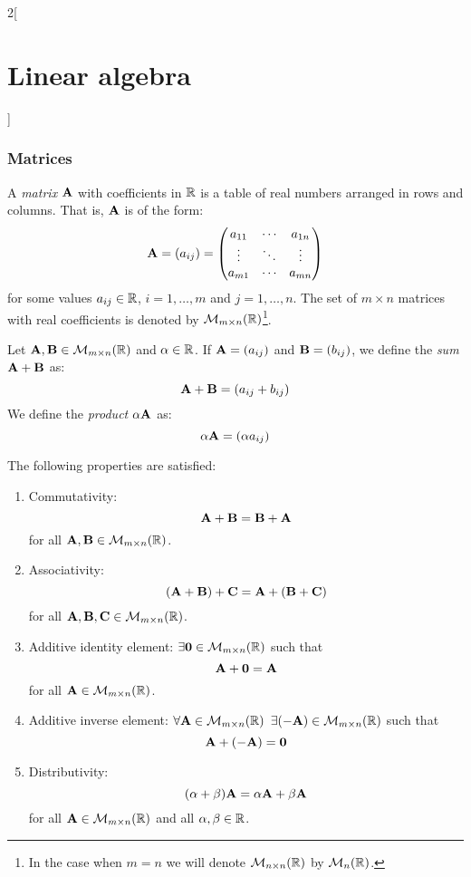 \documentclass[../../../main_math.tex]{subfiles}
\begin{document}
\begin{multicols}{2}[\section{Linear algebra}]
  \subsubsection{Matrices}
  \begin{definition}[Matrix]
    A \emph{matrix} $\boldsymbol{\mathrm{A}}$ with coefficients in $\mathbb{R}$ is a table of real numbers arranged in rows and columns. That is, $\boldsymbol{\mathrm{A}}$ is of the form:
    \begin{equation*}
      \boldsymbol{\mathrm{A}}=(a_{ij})=
      \begin{pmatrix}
        a_{11} & \cdots & a_{1n} \\
        \vdots & \ddots & \vdots \\
        a_{m1} & \cdots & a_{mn}
      \end{pmatrix}
    \end{equation*}
    for some values $a_{ij}\in\mathbb{R}$, $i=1,\ldots,m$ and $j=1,\ldots,n$. The set of $m\times n$ matrices with real coefficients is denoted by $\mathcal{M}_{m\times n}(\mathbb{R})$\footnote{In the case when $m=n$ we will denote $\mathcal{M}_{n\times n}(\mathbb{R})$ by $\mathcal{M}_n(\mathbb{R})$.}.
  \end{definition}
  \begin{definition}
    Let $\boldsymbol{\mathrm{A}},\boldsymbol{\mathrm{B}}\in\mathcal{M}_{m\times n}(\mathbb{R})$ and $\alpha\in\mathbb{R}$. If $\boldsymbol{\mathrm{A}}=(a_{ij})$ and $\boldsymbol{\mathrm{B}}=(b_{ij})$, we define the \emph{sum} $\boldsymbol{\mathrm{A}}+\boldsymbol{\mathrm{B}}$ as: $$\boldsymbol{\mathrm{A}}+\boldsymbol{\mathrm{B}}=(a_{ij}+b_{ij})$$
    We define the \emph{product} $\alpha\boldsymbol{\mathrm{A}}$ as: $$\alpha\boldsymbol{\mathrm{A}}=(\alpha a_{ij})$$
  \end{definition}
  \begin{proposition}
    The following properties are satisfied:
    \begin{enumerate}
      \item Commutativity: $$\boldsymbol{\mathrm{A}}+\boldsymbol{\mathrm{B}}=\boldsymbol{\mathrm{B}}+\boldsymbol{\mathrm{A}}$$ for all $\boldsymbol{\mathrm{A}},\boldsymbol{\mathrm{B}}\in\mathcal{M}_{m\times n}(\mathbb{R})$.
      \item Associativity: $$(\boldsymbol{\mathrm{A}}+\boldsymbol{\mathrm{B}})+\boldsymbol{\mathrm{C}}=\boldsymbol{\mathrm{A}}+(\boldsymbol{\mathrm{B}}+\boldsymbol{\mathrm{C}})$$ for all $\boldsymbol{\mathrm{A}},\boldsymbol{\mathrm{B}},\boldsymbol{\mathrm{C}}\in\mathcal{M}_{m\times n}(\mathbb{R})$.
      \item Additive identity element: $\exists\boldsymbol{\mathrm{0}}\in\mathcal{M}_{m\times n}(\mathbb{R})$ such that $$\boldsymbol{\mathrm{A}}+\boldsymbol{\mathrm{0}}=\boldsymbol{\mathrm{A}}$$ for all $\boldsymbol{\mathrm{A}}\in\mathcal{M}_{m\times n}(\mathbb{R})$.
      \item Additive inverse element: $\forall\boldsymbol{\mathrm{A}}\in\mathcal{M}_{m\times n}(\mathbb{R})$ $\exists(-\boldsymbol{\mathrm{A}})\in\mathcal{M}_{m\times n}(\mathbb{R})$ such that $$\boldsymbol{\mathrm{A}}+(-\boldsymbol{\mathrm{A}})=\boldsymbol{\mathrm{0}}$$
      \item Distributivity: $$(\alpha+\beta)\boldsymbol{\mathrm{A}}=\alpha\boldsymbol{\mathrm{A}}+\beta\boldsymbol{\mathrm{A}}$$ for all $\boldsymbol{\mathrm{A}}\in\mathcal{M}_{m\times n}(\mathbb{R})$ and all $\alpha,\beta\in\mathbb{R}$.

\end{enumerate}
\end{proposition}
\end{multicols}
\end{document}
